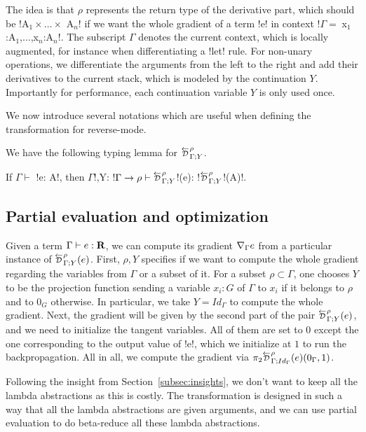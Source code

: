 The idea is that $\rho$ represents the return type of the derivative part, which should be !A$_{1} \times \ldots \times$ A$_n$! 
if we want the whole gradient of a term !e! in context !$\Gamma = \;$x$_{1}$:A$_{1}$,$\ldots$,x$_n$:A$_n$!.
The subscript $\Gamma$ denotes the current context, 
which is locally augmented, for instance when differentiating a !let! rule.
For non-unary operations, we differentiate the arguments from the left to the right and add their derivatives to the current stack, 
which is modeled by the continuation $Y$. 
Importantly for performance, each continuation variable $Y$ is only used once.

We now introduce several notations which are useful when defining the transformation for reverse-mode.



We have the following typing lemma for $\directD{\rho}{\Gamma}{Y}$.
\begin{lemma}
    If $\Gamma \vdash$ !e: A!, then $\Gamma$!,Y: !$\Gamma\to \rho \vdash \directD{\rho}{\Gamma}{Y}$!(e): !$\directD{\rho}{\Gamma}{Y}$!(A)!.
\end{lemma}



\subsection{Partial evaluation and optimization} %
\label{sub:Partial evaluation and optimization}

Given a term $\Gamma\vdash e : \mathbf{R}$, we can compute its gradient $\nabla_\Gamma e$ from a particular instance of 
$\directD{\rho}{\Gamma}{Y}(e)$. First, $\rho, Y$ specifies if we want to compute the whole gradient regarding the variables from $\Gamma$ or a subset of it.
For a subset $\rho\subset \Gamma$, one chooses $Y$ to be the projection function sending a variable 
$x_i:G$ of $\Gamma$ to $x_i$ if it belongs to $\rho$ and to $0_G$ otherwise.
In particular, we take $Y=Id_\Gamma$ to compute the whole gradient.
Next, the gradient will be given by the second part of the pair $\directD{\rho}{\Gamma}{Y}(e)$, 
and we need to initialize the tangent variables. All of them are set to $0$ except the one corresponding to the output value of !e!, 
which we initialize at $1$ to run the backpropagation. 
All in all, we compute the gradient via $\pi_2\directD{\rho}{\Gamma}{Id_\Gamma}(e)(0_\Gamma,1)$.

Following the insight from Section~\ref{subsec:insights}, 
we don't want to keep all the lambda abstractions as this is costly. 
The transformation is designed in such a way that all the lambda abstractions are given arguments,  
and we can use partial evaluation to do beta-reduce all these lambda abstractions.

